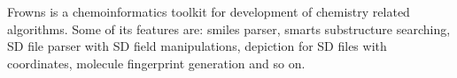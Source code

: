 Frowns is a chemoinformatics toolkit for development of chemistry related algorithms. Some of its features are: smiles parser, smarts substructure searching, SD file parser with SD field manipulations, depiction for SD files with coordinates, molecule fingerprint generation and so on.